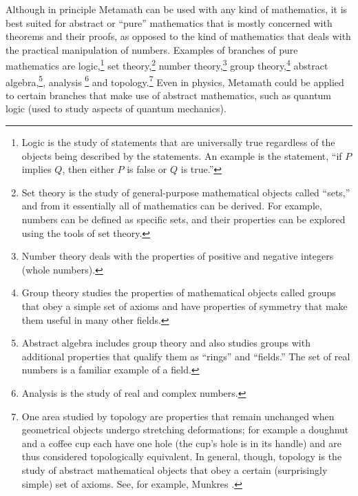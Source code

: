 Although in principle Metamath can be used with any
kind of mathematics, it is best suited for abstract or ``pure'' mathematics
that is mostly concerned with theorems and their proofs, as opposed to the
kind of mathematics that deals with the practical manipulation of numbers.
Examples of branches of pure mathematics are logic,\footnote{Logic
is the study of statements that are universally true regardless of the objects
being described by the statements.  An example is the statement, ``if $P$
implies $Q$, then either $P$ is false or $Q$ is true.''} set theory,\footnote{Set theory is the study of general-purpose mathematical objects called
``sets,'' and from it essentially all of mathematics can be derived.  For
example, numbers can be defined as specific sets, and their properties
can be explored using the tools of set theory.} number theory,\footnote{Number theory deals with the properties of positive and
negative integers (whole numbers).} group theory,\footnote{Group theory studies the properties of mathematical objects
called groups that obey a simple set of axioms and have properties of symmetry
that make them useful in many other fields.} abstract algebra,\footnote{Abstract algebra includes group theory and also studies
groups with additional properties that qualify them as ``rings'' and
``fields.''  The set of real numbers is a familiar example of a field.},
analysis \footnote{Analysis is
the study of real and complex numbers.} and
topology.\footnote{One area studied by topology are properties
that remain unchanged when geometrical objects undergo stretching
deformations; for example a doughnut and a coffee cup each have one hole (the
cup's hole is in its handle) and are thus considered topologically
equivalent.  In general, though, topology is the study of abstract
mathematical objects that obey a certain (surprisingly simple) set of axioms.
See, for example, Munkres \cite{Munkres}.} Even in
physics, Metamath could be applied to certain branches that make use of
abstract mathematics, such as quantum logic (used to study
aspects of quantum mechanics).

